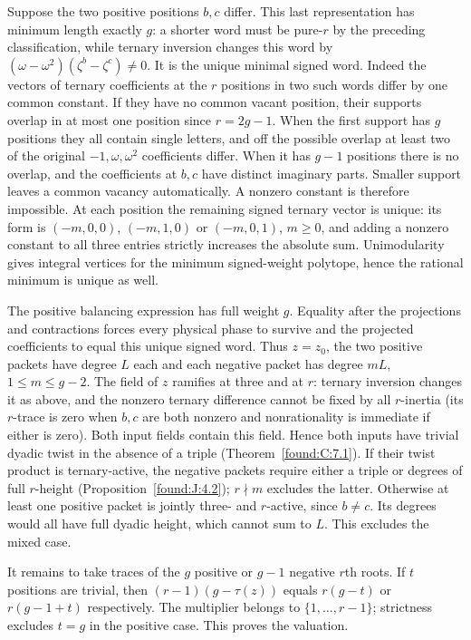 \documentclass[11pt,a4paper]{article}
\numberwithin{equation}{section}
\theoremstyle{remark}
\begin{document}
Suppose the two positive positions $b,c$ differ. This last representation has minimum length exactly $g$: a shorter word must be pure-$r$ by the preceding classification, while ternary inversion changes this word by $(\omega-\omega^2)(\zeta^b-\zeta^c)\ne0$. It is the unique minimal signed word. Indeed the vectors of ternary coefficients at the $r$ positions in two such words differ by one common constant. If they have no common vacant position, their supports overlap in at most one position since $r=2g-1$. When the first support has $g$ positions they all contain single letters, and off the possible overlap at least two of the original $-1,\omega,\omega^2$ coefficients differ. When it has $g-1$ positions there is no overlap, and the coefficients at $b,c$ have distinct imaginary parts. Smaller support leaves a common vacancy automatically. A nonzero constant is therefore impossible. At each position the remaining signed ternary vector is unique: its form is $(-m,0,0)$, $(-m,1,0)$ or $(-m,0,1)$, $m\ge0$, and adding a nonzero constant to all three entries strictly increases the absolute sum. Unimodularity gives integral vertices for the minimum signed-weight polytope, hence the rational minimum is unique as well.

The positive balancing expression has full weight $g$. Equality after the projections and contractions forces every physical phase to survive and the projected coefficients to equal this unique signed word. Thus $z=z_0$, the two positive packets have degree $L$ each and each negative packet has degree $mL$, $1\le m\le g-2$. The field of $z$ ramifies at three and at $r$: ternary inversion changes it as above, and the nonzero ternary difference cannot be fixed by all $r$-inertia (its $r$-trace is zero when $b,c$ are both nonzero and nonrationality is immediate if either is zero). Both input fields contain this field. Hence both inputs have trivial dyadic twist in the absence of a triple (Theorem~\ref{found:C:7.1}). If their twist product is ternary-active, the negative packets require either a triple or degrees of full $r$-height (Proposition~\ref{found:J:4.2}); $r\nmid m$ excludes the latter. Otherwise at least one positive packet is jointly three- and $r$-active, since $b\ne c$. Its degrees would all have full dyadic height, which cannot sum to $L$. This excludes the mixed case.

It remains to take traces of the $g$ positive or $g-1$ negative $r$th roots. If $t$ positions are trivial, then $(r-1)(g-\tau(z))$ equals $r(g-t)$ or $r(g-1+t)$ respectively. The multiplier belongs to $\{1,\ldots,r-1\}$; strictness excludes $t=g$ in the positive case. This proves the valuation.
\end{document}
